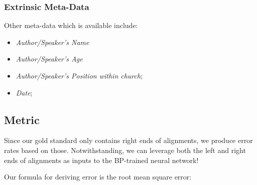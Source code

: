 \subsubsection{Extrinsic Meta-Data}
Other meta-data which is available include:
	\begin{itemize}
		\item \textit{Author/Speaker's Name}
		\item \textit{Author/Speaker's Age}
		\item \textit{Author/Speaker's Position within church};
		\item \textit{Date};
	\end{itemize}


\subsection{Metric}
Since our gold standard only contains right ends of alignments, we produce error rates based on those. Notwithstanding, we can leverage both the left and right ends of alignments as inputs to the BP-trained neural network!

Our formula for deriving error is the root mean square error:


